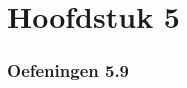 \documentclass[lineaire_algebra_oplossingen.tex]{subfiles}
\begin{document}
\newpage
\part{Hoofdstuk 5}
\section{Oefeningen 5.9}
\end{document}
